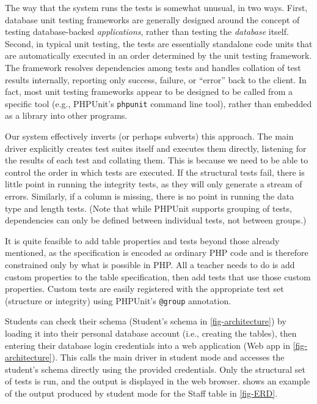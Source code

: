 \documentclass[sigconf, authordraft, capitalise]{acmart}
\begin{document}
The way that the system runs the tests is somewhat unusual, in two ways. First, database unit testing frameworks are generally designed around the concept of testing database-backed \emph{applications}, rather than testing the \emph{database} itself. Second, in typical unit testing, the tests are essentially standalone code units that are automatically executed in an order determined by the unit testing framework. The framework resolves dependencies among tests and handles collation of test results internally, reporting only success, failure, or ``error'' back to the client. In fact, most unit testing frameworks appear to be designed to be called from a specific tool (e.g., PHPUnit's \texttt{phpunit} command line tool), rather than embedded as a library into other programs.

Our system effectively inverts (or perhaps subverts) this approach. The main driver explicitly creates test suites itself and executes them directly, listening for the results of each test and collating them. This is because we need to be able to control the order in which tests are executed. If the structural tests fail, there is little point in running the integrity tests, as they will only generate a stream of errors. Similarly, if a column is missing, there is no point in running the data type and length tests. (Note that while PHPUnit supports grouping of tests, dependencies can only be defined between individual tests, not between groups.)

It is quite feasible to add table properties and tests beyond those already mentioned, as the specification is encoded as ordinary PHP code and is therefore constrained only by what is possible in PHP. All a teacher needs to do is add custom properties to the table specification, then add tests that use those custom properties. Custom tests are easily registered with the appropriate test set (structure or integrity) using PHPUnit's \texttt{@group} annotation.

Students can check their schema (\textsf{Student's schema} in \cref{fig-architecture}) by loading it into their personal database account (i.e., creating the tables), then entering their database login credentials into a web application (\textsf{Web app} in \cref{fig-architecture}). This calls the main driver in student mode and accesses the student's schema directly using the provided credentials. Only the structural set of tests is run, and the output is displayed in the web browser.  shows an example of the output produced by student mode for the \textsf{Staff} table in \cref{fig-ERD}.
\end{document}
